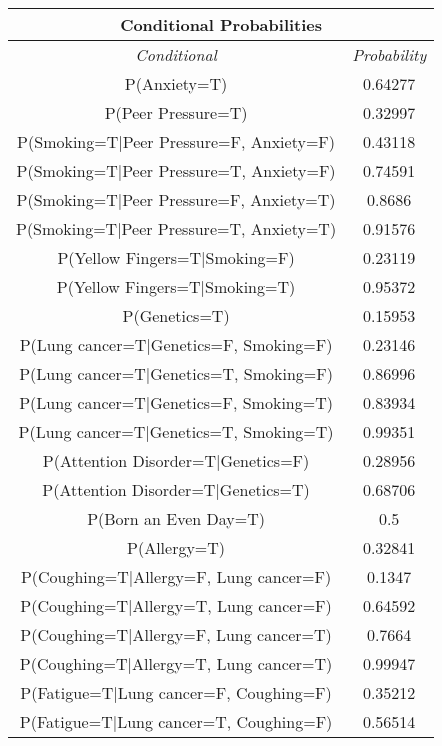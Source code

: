 \documentclass{article}
\begin{document}
\begin{table}[h]
    \centering
    \begin{tabular}{|c|c|}
        \hline
        \multicolumn{2}{|c|}{\textbf{Conditional Probabilities}} \\
        \hline
        \textit{Conditional} & \textit{Probability} \\
        \hline
        P(Anxiety=T) & 0.64277 \\ \hline
        P(Peer Pressure=T) & 0.32997 \\ \hline
        P(Smoking=T|Peer Pressure=F, Anxiety=F) & 0.43118 \\ \hline
        P(Smoking=T|Peer Pressure=T, Anxiety=F) & 0.74591 \\ \hline
        P(Smoking=T|Peer Pressure=F, Anxiety=T) & 0.8686 \\ \hline
        P(Smoking=T|Peer Pressure=T, Anxiety=T) & 0.91576 \\ \hline
        P(Yellow Fingers=T|Smoking=F) & 0.23119 \\ \hline
        P(Yellow Fingers=T|Smoking=T) & 0.95372 \\ \hline
        P(Genetics=T) & 0.15953 \\ \hline
        P(Lung cancer=T|Genetics=F, Smoking=F) & 0.23146 \\ \hline
        P(Lung cancer=T|Genetics=T, Smoking=F) & 0.86996 \\ \hline
        P(Lung cancer=T|Genetics=F, Smoking=T) & 0.83934 \\ \hline
        P(Lung cancer=T|Genetics=T, Smoking=T) & 0.99351 \\ \hline
        P(Attention Disorder=T|Genetics=F) & 0.28956 \\ \hline
        P(Attention Disorder=T|Genetics=T) & 0.68706 \\ \hline
        P(Born an Even Day=T) & 0.5 \\ \hline
        P(Allergy=T) & 0.32841 \\ \hline
        P(Coughing=T|Allergy=F, Lung cancer=F) & 0.1347 \\ \hline
        P(Coughing=T|Allergy=T, Lung cancer=F) & 0.64592 \\ \hline
        P(Coughing=T|Allergy=F, Lung cancer=T) & 0.7664 \\ \hline
        P(Coughing=T|Allergy=T, Lung cancer=T) & 0.99947 \\ \hline
        P(Fatigue=T|Lung cancer=F, Coughing=F) & 0.35212 \\ \hline
        P(Fatigue=T|Lung cancer=T, Coughing=F) & 0.56514 \\ \hline

\end{tabular}
\end{table}
\end{document}
